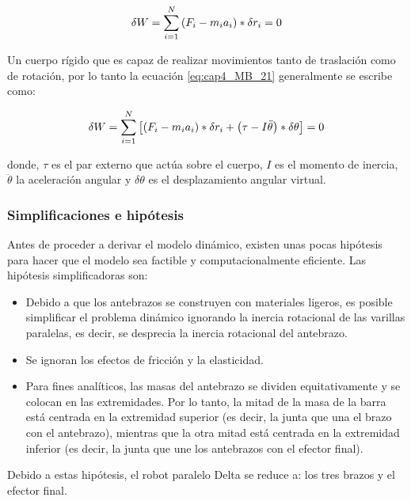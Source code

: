         \begin{equation}
          \delta W= \sum _{i=1}^{N} \left( F_{i}-m_{i}a_{i} \right) \ast \delta r_{i}=0 \\
         \label{eq:cap4_MB_21}
        \end{equation}

        
        Un cuerpo rígido que es capaz de realizar movimientos tanto de traslación como de rotación, por lo tanto la ecuación \ref{eq:cap4_MB_21} generalmente se escribe como:
        
        \begin{equation}
          \delta W= \sum _{i=1}^{N} \left[  \left( F_{i}-m_{i}a_{i} \right) \ast \delta r_{i}+ \left(  \tau-I\ddot{ \theta } \right) \ast \delta  \theta  \right] =0 \\
         \label{eq:cap4_MB_22}
        \end{equation}
        
        donde,  $\tau $  es el par externo que actúa sobre el cuerpo,  $ I $  es el momento de inercia,  $\ddot{ \theta }$   la aceleración angular y  $ \delta  \theta  $  es el desplazamiento angular virtual.
        
        \newpage


        \subsubsection{Simplificaciones e hipótesis}
        Antes de proceder a derivar el modelo dinámico, existen unas pocas hipótesis para hacer que el modelo sea factible y computacionalmente eficiente. Las hipótesis simplificadoras son:
        
        \begin{itemize}
            \item Debido a que los antebrazos se construyen con materiales ligeros, es posible simplificar el problema dinámico ignorando la inercia rotacional de las varillas paralelas, es decir, se desprecia la inercia rotacional del antebrazo.
            \item Se ignoran los efectos de fricción y la elasticidad.
            \item Para fines analíticos, las masas del antebrazo se dividen equitativamente y se colocan en las extremidades. Por lo tanto, la mitad de la masa de la barra está centrada en la extremidad superior (es decir, la junta que una el brazo con el antebrazo), mientras que la otra mitad está centrada en la extremidad inferior (es decir, la junta que une los antebrazos con el efector final).
        \end{itemize}
        Debido a estas hipótesis, el robot paralelo Delta se reduce a: los tres brazos y el efector final.
     
